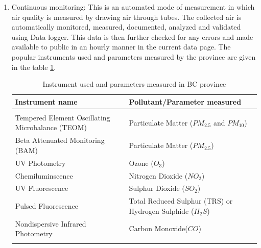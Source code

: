  \begin{enumerate}
  \item Continuous monitoring: This is an automated mode of measurement in which air quality is measured by drawing air through tubes. The collected air is automatically monitored, measured, documented, analyzed and validated using Data logger. This data is then further checked for any errors and made available to public in an hourly manner in the current data page. The popular instruments used  and parameters measured by the province are given in the table \ref{contmont}.
  

  
 \begin{table}[h]
   
   
  \begin{tabularx}{\columnwidth}{X|X}
      \hline
      Instrument name         & Pollutant/Parameter measured   \\
      \hline
     \\
     Tempered Element Oscillating Microbalance (TEOM)  &     Particulate Matter ($PM_{2.5}$ and $PM_{10}$)     \\ 
     Beta Attenuated Monitoring (BAM)                  &     Particulate Matter ($PM_{2.5}$)                   \\ 
     UV Photometry                                     &     Ozone ($O_{3}$)                                   \\ 
     Chemiluminscence                                  &     Nitrogen Dioxide ($NO_{2}$)                        \\ 
     UV Fluorescence                                   &     Sulphur Dioxide ($SO_{2}$)                         \\ 
     Pulsed Fluorescence                               &    Total Reduced Sulphur (TRS) or Hydrogen Sulphide ($H_{2}S$) \\
     Nondispersive Infrared Photometry & Carbon Monoxide($CO$)\\ 
     
     \\
     
     \hline
   
    
    
\end{tabularx}
  \caption{Instrument used and parameters measured in BC province}
  \label{contmont}
\end{table}
  



\end{enumerate}
